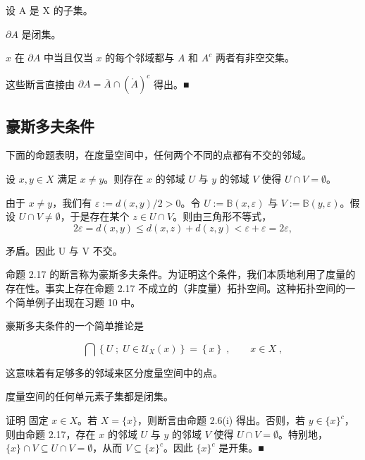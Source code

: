 \begin{proposition}

设 A 是 X 的子集。

\begin{subitems}
\item

$ \partial A $ 是闭集。

\item

$x$ 在 $\partial A$ 中当且仅当 $x$ 的每个邻域都与 $A$ 和 $A^{c}$ 两者有非空交集。

\proofhead
这些断言直接由 $ \partial A = \overline{A} \cap (\mathring{A})^{c} $ 得出。■
\end{subitems}

\end{proposition}

\subsection*{豪斯多夫条件}

下面的命题表明，在度量空间中，任何两个不同的点都有不交的邻域。

\begin{proposition}

设 $x, y \in X$ 满足 $x \neq y$。则存在 $x$ 的邻域 $U$ 与 $y$ 的邻域 $V$ 使得 $U \cap V = \emptyset$。

\proofhead
由于 $ x \neq y $，我们有 $ \varepsilon := d(x, y)/2 > 0 $。令 $ U := \mathbb{B}(x, \varepsilon) $ 与 $ V := \mathbb{B}(y, \varepsilon) $。假设 $ U \cap V \neq \emptyset $，于是存在某个 $ z \in U \cap V $。则由三角形不等式，
\[
2\varepsilon=d(x,y)\leq d(x,z)+d(z,y)<\varepsilon+\varepsilon=2\varepsilon,
\]

矛盾。因此 U 与 V 不交。

命题 2.17 的断言称为豪斯多夫条件。为证明这个条件，我们本质地利用了度量的存在性。事实上存在命题 2.17 不成立的（非度量）拓扑空间。这种拓扑空间的一个简单例子出现在习题 10 中。

豪斯多夫条件的一个简单推论是

\[
\bigcap\left\{U\;;\;U\in\mathcal{U}_{X}(x)\right\}=\left\{x\right\}\;,\qquad x\in X\;,
\]

这意味着有足够多的邻域来区分度量空间中的点。

\end{proposition}

\begin{corollary}

度量空间的任何单元素子集都是闭集。

证明 固定 $x \in X$。若 $X = \{x\}$，则断言由命题 2.6(i) 得出。否则，若 $y \in \{x\}^c$，则由命题 2.17，存在 $x$ 的邻域 $U$ 与 $y$ 的邻域 $V$ 使得 $U \cap V = \emptyset$。特别地，$\{x\} \cap V \subseteq U \cap V = \emptyset$，从而 $V \subseteq \{x\}^c$。因此 $\{x\}^c$ 是开集。■

\end{corollary}

